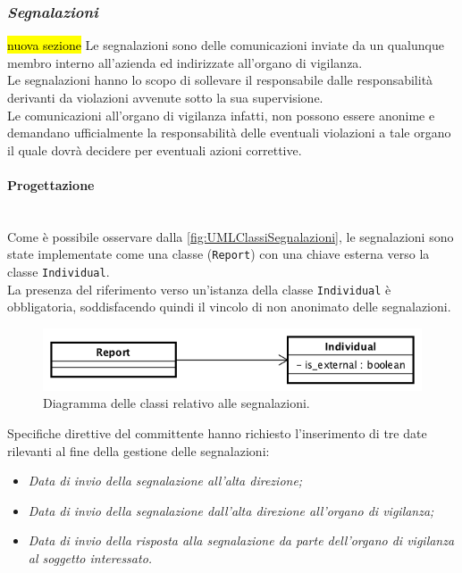 \subsubsection{\textit{Segnalazioni}}
\hl{nuova sezione}
Le segnalazioni sono delle comunicazioni inviate da un qualunque membro interno all'azienda ed indirizzate all'organo di vigilanza.\\
Le segnalazioni hanno lo scopo di sollevare il responsabile dalle responsabilità derivanti da violazioni avvenute sotto la sua supervisione. \\
Le comunicazioni all'organo di vigilanza infatti, non possono essere anonime e demandano ufficialmente la responsabilità delle eventuali violazioni a tale organo il quale dovrà decidere per eventuali azioni correttive.
	
	\paragraph*{Progettazione}\mbox{} \\
	Come è possibile osservare dalla \autoref{fig:UMLClassiSegnalazioni}, le segnalazioni sono state implementate come una classe (\texttt{Report}) con una chiave esterna verso la classe \texttt{Individual}. \\
	La presenza del riferimento verso un'istanza della classe \texttt{Individual} è obbligatoria, soddisfacendo quindi il vincolo di non anonimato delle segnalazioni.\\
	\begin{figure}[H]
		\begin{center}
			\includegraphics[width=12cm]{Pics/UMLClassiSegnalazioni.png}
			\caption{Diagramma delle classi relativo alle segnalazioni.}
			\label{fig:UMLClassiSegnalazioni}
		\end{center}
	\end{figure}
	Specifiche direttive del committente hanno richiesto l'inserimento di tre date rilevanti al fine della gestione delle segnalazioni:
	\begin{itemize}
		\item \textit{Data di invio della segnalazione all'alta direzione;}
		\item \textit{Data di invio della segnalazione dall'alta direzione all'organo di vigilanza;}
		\item \textit{Data di invio della risposta alla segnalazione da parte dell'organo di vigilanza al soggetto interessato.}
	\end{itemize}
